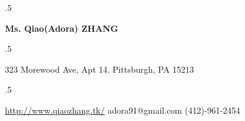


\hypersetup{backref,pdfpagemode=Full,colorlinks=true,urlcolor=black,backref}

\addtolength{\oddsidemargin}{-0.45in}
\addtolength{\voffset}{-0.30in}
\addtolength{\textwidth}{1.00in} \addtolength{\textheight}{1.50in}
\renewcommand{\namefont}{\LARGE\emph}




\def\Cplusplus{{\rm C\raise.5ex\hbox{\small ++}}}
\def\CSharp{{\rm C\raise.5ex\hbox{\small \#}}}
\def\first{{\raise.5ex\hbox{\small st}}}
\def\second{{\raise.5ex\hbox{\small nd}}}
\def\third{{\raise.5ex\hbox{\small rd}}}
\def\fourth{{\raise.5ex\hbox{\small th}}}






 \moveleft.5\hoffset\centerline{\large\bf Ms. Qiao(Adora) ZHANG}
 \moveleft.5\hoffset\centerline{323 Morewood Ave, Apt 14. Pittsburgh, PA 15213}
 \moveleft.5\hoffset\centerline{\href{http://www.qiaozhang.tk/}{http://www.qiaozhang.tk/} \hfill adora91@gmail.com \hfill (412)-961-2454}

